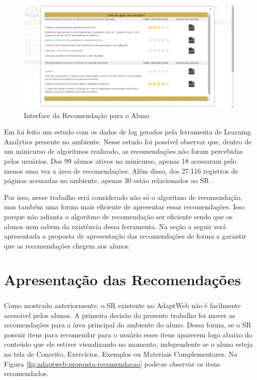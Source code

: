 \begin{figure}[htb]
  \caption{\label{fig:adaptweb-itens-recomendacao}Interface da Recomendação para o Aluno}
  \begin{center}
      \includegraphics[scale=1.0]{./Figuras/adaptweb-itens-recomendacao.png}
  \end{center}
\end{figure}

Em  foi feito um estudo com os dados de log gerados pela ferramenta de Learning Analytics
presente no ambiente. Nesse estudo foi possível observar que, dentro de um minicurso de algoritmos realizado, as
recomendações não foram percebidas pelos usuários. Dos 99 alunos ativos no minicurso, apenas 18 acessaram pelo menos
uma vez a área de recomendações. Além disso, dos 27.116 registros de páginas acessadas no ambiente, apenas 30 estão
relacionados ao SR \cite{de2017sistema}.

Por isso, nesse trabalho será considerado não só o algoritmo de recomendação, mas também uma forma mais eficiente de
apresentar essas recomendações. Isso porque não adianta o algoritmo de recomendação ser eficiente sendo que os alunos
nem sabem da existência dessa ferramenta. Na seção a seguir será apresentada a proposta de apresentação das
recomendações de forma a garantir que as recomendações chegem aos alunos.

\section{Apresentação das Recomendações}

Como mostrado anteriormente, o SR existente no AdaptWeb\textsuperscript{\textregistered} não é facilmente acessável pelos
alunos. A primeira decisão do presente trabalho foi mover as recomendações para a área principal do ambiente do aluno.
Dessa forma, se o SR possuir itens para recomendar para o usuário esses itens aparecem logo abaixo do conteúdo que ele estiver
visualizando no momento, independente se o aluno esteja na tela de Conceito, Exercícios, Exemplos ou Materiais Complementares.
Na Figura \ref{fig:adaptweb-proposta-recomendacao} pode-se observar os itens recomendados.

